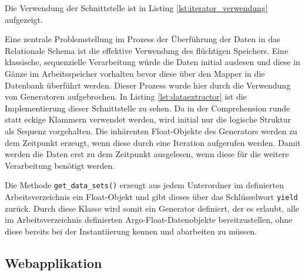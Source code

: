 
Die Verwendung der Schnittstelle ist in Listing \ref{lst:iterator_verwendung} aufgezeigt. 

    
    
    
Eine zentrale Problemstellung im Prozess der Überführung der Daten in das Relationale Schema ist die effektive Verwendung des flüchtigen Speichers. Eine klassische, sequenzielle Verarbeitung würde die Daten initial auslesen und diese in Gänze im Arbeitsspeicher vorhalten bevor diese über den Mapper in die Datenbank überführt werden. Dieser Prozess wurde hier durch die Verwendung von Generatoren aufgebrochen. In Listing \ref{lst:dataextractor} ist die Implementierung dieser Schnittstelle zu sehen. Da in der Comprehension runde statt eckige Klammern verwendet werden, wird initial nur die logische Struktur als Sequenz vorgehalten. Die inhärenten Float-Objekte des Generators werden zu dem Zeitpunkt erzeugt, wenn diese durch eine Iteration aufgerufen werden. Damit werden die Daten erst zu dem Zeitpunkt ausgelesen, wenn diese für die weitere Verarbeitung benötigt werden.
    


Die Methode \texttt{get\_data\_sets()} erzeugt aus jedem Unterordner im definierten Arbeitsverzeichnis ein Float-Objekt und gibt dieses über das Schlüsselwort \texttt{yield} zurück. Durch diese Klasse wird somit ein Generator definiert, der es erlaubt, alle im Arbeitsverzeichnis definierten Argo-Float-Datenobjekte bereitzustellen, ohne diese bereits bei der Instantiierung kennen und abarbeiten zu müssen.



    

    


\subsection{Webapplikation}

